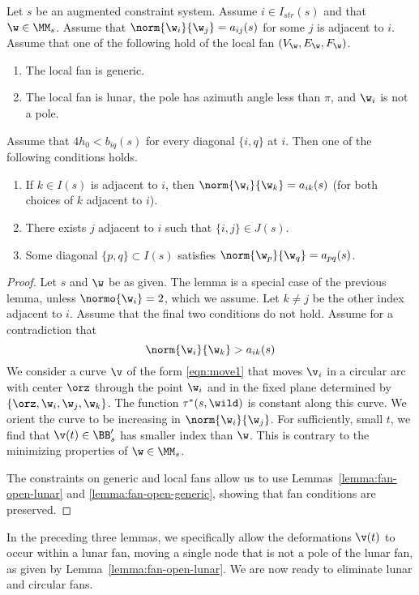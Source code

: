 \begin{lemma}
Let $s$ be an augmented constraint system.  Assume $i\in I_{str}(s)$
and that $\w\in \MM_s$.   
Assume that $\norm{\w_i}{\w_j}=a_{ij}(s)$ for
some $j$ is adjacent to $i$.  
Assume  that one of the following hold of the local fan $(V_\w,E_\w,F_\w)$.
\begin{enumerate}
\item The local fan is generic.
\item The local fan is lunar, the pole has azimuth
angle less than $\pi$, and $\w_i$ is not a pole.  
\end{enumerate}
Assume that $4h_0 < b_{iq}(s)$ for every diagonal $\{i,q\}$ at $i$.
Then
one of the following conditions holds.
\begin{enumerate}
\item If $k\in I(s)$ is adjacent to $i$, then $\norm{\w_i}{\w_k}=a_{ik}(s)$
(for both choices of $k$ adjacent to $i$).
\item There exists $j$ adjacent to $i$ such that $\{i,j\}\in J(s)$.
\item Some diagonal $\{p,q\}\subset I(s)$ satisfies
$\norm{\w_p}{\w_q}=a_{p q}(s)$.
\end{enumerate}
\end{lemma}

\begin{proof} Let $s$ and $\w$ be as given.  The lemma is a special
case of the previous lemma, unless $\normo{\w_i}=2$, which we assume.
Let $k\ne j$ be the other index adjacent to $i$.
Assume that the final
two conditions do not hold.
Assume for a contradiction that 
\[
\norm{\w_i}{\w_k}>a_{i k}(s)
\]
We consider a curve $\v$ of the form \eqref{eqn:move1} that moves $\v_i$
in a circular arc with center $\orz$ through the point $\w_i$ and in
the fixed plane determined by $\{\orz,\w_i,\w_j,\w_{k}\}$.  
The function $\tau^*(s,\wild)$ is
constant along this curve.  We orient the curve to be increasing
in $\norm{\w_i}{\w_{j}}$.  For sufficiently, small $t$, we find that
$\v(t)\in\BB'_s$ has smaller index than $\w$.  This is contrary to the minimizing
properties of $\w\in\MM_s$.

The constraints on generic and local fans
allow us to use Lemmas~\ref{lemma:fan-open-lunar} and
\ref{lemma:fan-open-generic}, showing that fan conditions are preserved.
\end{proof}

In the preceding three lemmas, we specifically allow the deformations
$\v(t)$ to occur within a lunar fan, moving a single node that is not a pole
of the lunar fan, as given by Lemma~\ref{lemma:fan-open-lunar}.
We are now ready to eliminate  lunar and circular
fans.

